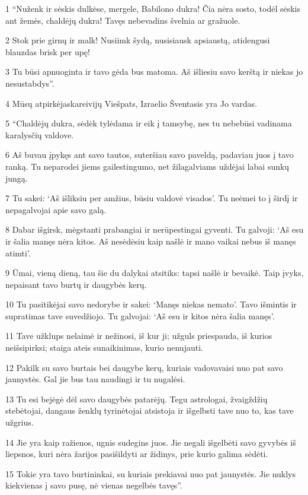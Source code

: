 \par 1 “Nuženk ir sėskis dulkėse, mergele, Babilono dukra! Čia nėra sosto, todėl sėskis ant žemės, chaldėjų dukra! Tavęs nebevadins švelnia ar gražuole. 
\par 2 Stok prie girnų ir malk! Nusiimk šydą, nusisiausk apsiaustą, atidengusi blauzdas brisk per upę! 
\par 3 Tu būsi apnuoginta ir tavo gėda bus matoma. Aš išliesiu savo kerštą ir niekas jo nesustabdys”. 
\par 4 Mūsų atpirkėjas­kareivijų Viešpats, Izraelio Šventasis yra Jo vardas. 
\par 5 “Chaldėjų dukra, sėdėk tylėdama ir eik į tamsybę, nes tu nebebūsi vadinama karalysčių valdove. 
\par 6 Aš buvau įpykęs ant savo tautos, suteršiau savo paveldą, padaviau juos į tavo ranką. Tu neparodei jiems gailestingumo, net žilagalviams uždėjai labai sunkų jungą. 
\par 7 Tu sakei: ‘Aš išliksiu per amžius, būsiu valdovė visados’. Tu neėmei to į širdį ir nepagalvojai apie savo galą. 
\par 8 Dabar išgirsk, mėgstanti prabangiai ir nerūpestingai gyventi. Tu galvoji: ‘Aš esu ir šalia manęs nėra kitos. Aš nesėdėsiu kaip našlė ir mano vaikai nebus iš manęs atimti’. 
\par 9 Ūmai, vieną dieną, tau šie du dalykai atsitiks: tapsi našlė ir bevaikė. Taip įvyks, nepaisant tavo burtų ir daugybės kerų. 
\par 10 Tu pasitikėjai savo nedorybe ir sakei: ‘Manęs niekas nemato’. Tavo išmintis ir supratimas tave suvedžiojo. Tu galvojai: ‘Aš esu ir kitos nėra šalia manęs’. 
\par 11 Tave užklups nelaimė ir nežinosi, iš kur ji; užguls priespauda, iš kurios neišsipirksi; staiga ateis sunaikinimas, kurio nenujauti. 
\par 12 Pakilk su savo burtais bei daugybe kerų, kuriais vadovavaisi nuo pat savo jaunystės. Gal jie bus tau naudingi ir tu nugalėsi. 
\par 13 Tu esi bejėgė dėl savo daugybės patarėjų. Tegu astrologai, žvaigždžių stebėtojai, dangaus ženklų tyrinėtojai atsistoja ir išgelbsti tave nuo to, kas tave užgrius. 
\par 14 Jie yra kaip ražienos, ugnis sudegins juos. Jie negali išgelbėti savo gyvybės iš liepsnos, kuri nėra žarijos pasišildyti ar židinys, prie kurio galima sėdėti. 
\par 15 Tokie yra tavo burtininkai, su kuriais prekiavai nuo pat jaunystės. Jie nuklys kiekvienas į savo pusę, nė vienas negelbės tavęs”.



